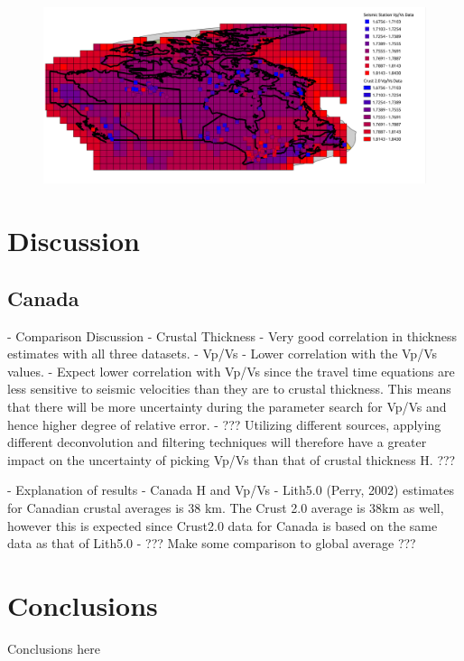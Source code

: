 \documentclass[draft, 12pt]{article}
\begin{document}
\begin{figure}
  \centering
  \includegraphics[width=\textwidth]{VpVsMapCrust}
  \caption{}
  \label{fig:VpVsMapCrust}
\end{figure}


\section{Discussion}
\subsection{Canada}

  - Comparison Discussion
    - Crustal Thickness
      - Very good correlation in thickness estimates with all three datasets.
    - Vp/Vs
      - Lower correlation with the Vp/Vs values.
        - Expect lower correlation with Vp/Vs since the travel time equations are
          less sensitive to seismic velocities than they are to crustal thickness.
          This means that there will be more uncertainty during the parameter
          search for Vp/Vs and hence higher degree of relative error.
        - ??? Utilizing different sources, applying different deconvolution and
          filtering techniques will therefore have a greater impact on the
          uncertainty of picking Vp/Vs than that of crustal thickness H. ???

   - Explanation of results
    - Canada H and Vp/Vs
      - Lith5.0 (Perry, 2002) estimates for Canadian crustal averages is 38 km. The Crust
        2.0 average is 38km as well, however this is expected since Crust2.0 data for
        Canada is based on the same data as that of Lith5.0
      - ??? Make some comparison to global average ???


\section{Conclusions}
Conclusions here
\end{document}
